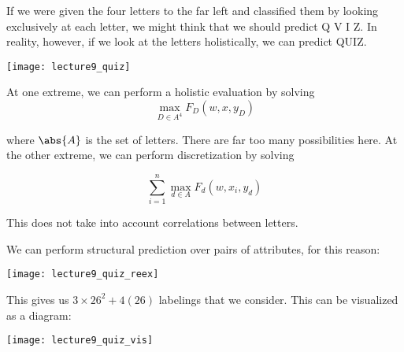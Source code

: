 \documentclass[../main.tex]{subfiles}
\begin{document}
\begin{example}
    If we were given the four letters to the far left and classified them by
    looking exclusively at each letter, we might think that we should predict
    Q V I Z. In reality, however, if we look at the letters holistically,
    we can predict QUIZ.

    \begin{center}
        \texttt{[image: lecture9\_quiz]}
    \end{center}

    At one extreme, we can perform a holistic evaluation by solving
    \[
        \max_{D \in A^4}F_D(w,x,y_D) 
    \]

    where $\abs{A}$ is the set of letters. There are far too many possibilities here.
    At the other extreme, we can perform discretization by solving

    \[
        \sum_{i=1}^{n}\max_{d \in A}F_d(w,x_i,y_d) 
    \]

    This does not take into account correlations between letters.
\end{example}

\begin{remark}
    We can perform structural prediction over pairs of attributes, for this reason:
    \begin{center}
        \texttt{[image: lecture9\_quiz\_reex]}
    \end{center}

    This gives us $3 \times 26^2 + 4(26)$ labelings that we consider.
    This can be visualized as a diagram:

    \begin{center}
        \texttt{[image: lecture9\_quiz\_vis]}
    \end{center}


\end{remark}
\end{document}
